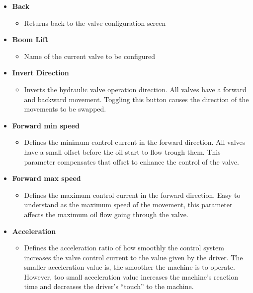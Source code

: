 \documentclass[12pt,a4paper,english]{uvmanual}
\begin{document}
\begin{itemize}
 \item \textbf{Back}
 \begin{itemize}
  \item Returns back to the valve configuration screen
 \end{itemize}

 \item \textbf{Boom Lift}
 \begin{itemize}
  \item Name of the current valve to be configured
 \end{itemize}

 \item \textbf{Invert Direction}
 \begin{itemize}
  \item Inverts the hydraulic valve operation direction. All valves have a forward and backward movement. Toggling this button causes the direction of the movements to be swapped.
 \end{itemize}

 \item \textbf{Forward min speed}
 \begin{itemize}
  \item Defines the minimum control current in the forward direction. All valves have a small offset before the oil start to flow trough them. This parameter compensates that offset to enhance the control of the valve.
 \end{itemize}

 \item \textbf{Forward max speed}
 \begin{itemize}
  \item Defines the maximum control current in the forward direction. Easy to understand as the maximum speed of the movement, this parameter affects the maximum oil flow going through the valve.
 \end{itemize}

 \item \textbf{Acceleration}
 \begin{itemize}
  \item Defines the acceleration ratio of how smoothly the control system increases the valve control current to the value given by the driver. The smaller acceleration value is, the smoother the machine is to operate. However, too small acceleration value increases the machine's reaction time and decreases the driver's ``touch'' to the machine.
 \end{itemize}


\end{itemize}
\end{document}
